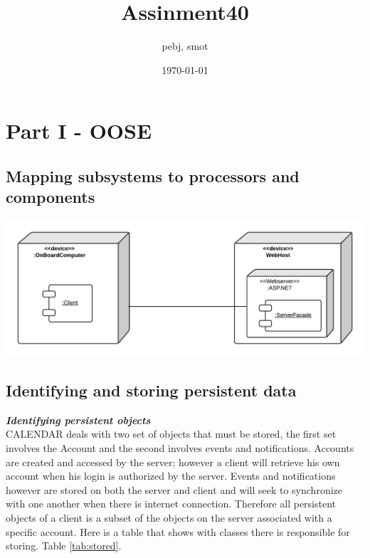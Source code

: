 \documentclass[a4paper]{article}
\title{Assinment40}
\author{pebj, smot}
\date{\today}
\begin{document}
\maketitle

\section{Part I - OOSE}

\subsection{Mapping subsystems to processors and components}

\includegraphics[scale = 0.3]{MappingSubsystems.png}

\subsection{Identifying and storing persistent data}

\textit{\textbf{Identifying persistent objects}}\\

CALENDAR deals with two set of objects that must be stored, the first set involves the Account and the second involves events and notifications. Accounts are created and accessed by the server; however a client will retrieve his own account when his login is authorized by the server. Events and notifications however are stored on both the server and client and will seek to synchronize with one another when there is internet connection. Therefore all persistent objects of a client is a subset of the objects on the server associated with a specific account. Here is a table that shows with classes there is responsible for storing. Table \ref{tab:stored}.  \\
\end{document}
